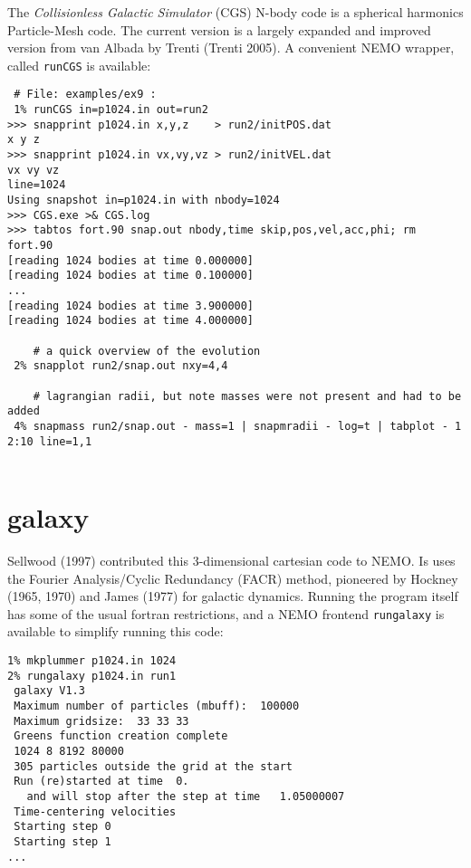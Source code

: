 {The {\it Collisionless Galactic Simulator} (CGS) N-body code is a spherical
harmonics Particle-Mesh code. The current version is a largely expanded and
improved version from van Albada by Trenti (Trenti 2005). A convenient
NEMO wrapper, called {\tt runCGS} is available:

\footnotesize
\begin{verbatim}
 # File: examples/ex9 :  
 1% runCGS in=p1024.in out=run2 
>>> snapprint p1024.in x,y,z    > run2/initPOS.dat
x y z
>>> snapprint p1024.in vx,vy,vz > run2/initVEL.dat
vx vy vz
line=1024
Using snapshot in=p1024.in with nbody=1024
>>> CGS.exe >& CGS.log
>>> tabtos fort.90 snap.out nbody,time skip,pos,vel,acc,phi; rm fort.90
[reading 1024 bodies at time 0.000000]
[reading 1024 bodies at time 0.100000]
...
[reading 1024 bodies at time 3.900000]
[reading 1024 bodies at time 4.000000]

    # a quick overview of the evolution 
 2% snapplot run2/snap.out nxy=4,4

    # lagrangian radii, but note masses were not present and had to be added
 4% snapmass run2/snap.out - mass=1 | snapmradii - log=t | tabplot - 1 2:10 line=1,1


\end{verbatim}
\normalsize




\section{galaxy}

Sellwood (1997) contributed this 3-dimensional cartesian code to NEMO. Is uses the
Fourier Analysis/Cyclic Redundancy (FACR) method, pioneered by
Hockney (1965, 1970) and James (1977) for galactic dynamics. Running
the program itself has some of the usual fortran 
restrictions, and a NEMO frontend {\tt rungalaxy}
is available to simplify running this code:

\footnotesize
\begin{verbatim}
1% mkplummer p1024.in 1024
2% rungalaxy p1024.in run1
 galaxy V1.3 
 Maximum number of particles (mbuff):  100000
 Maximum gridsize:  33 33 33
 Greens function creation complete
 1024 8 8192 80000
 305 particles outside the grid at the start
 Run (re)started at time  0.
   and will stop after the step at time   1.05000007
 Time-centering velocities
 Starting step 0
 Starting step 1
...


\end{verbatim}}
